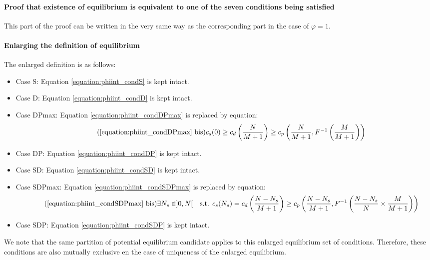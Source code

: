 \documentclass[english, a4paper]{article}
\theoremstyle{plain}
\theoremstyle{definition}
\theoremstyle{remark}
\begin{document}
\paragraph{Proof that existence of equilibrium is equivalent to one of the seven conditions being satisfied}

This part of the proof can be written in the very same way as the corresponding part in the case of $\varphi = 1$.

\paragraph{Enlarging the definition of equilibrium}

The enlarged definition is as follows:
\begin{itemize}
    \item Case S: Equation \ref{equation:phiint_condS} is kept intact.
    \item Case D: Equation \ref{equation:phiint_condD} is kept intact.
    \item Case DPmax: Equation \ref{equation:phiint_condDPmax} is replaced by equation:
    \begin{equation}
        \label{equation:phiint_condDPmaxbis}
        \tag{\ref{equation:phiint_condDPmax} bis}
        c_s(0) \geq c_d\left(\frac{N}{M + 1} \right) \geq c_p\left(\frac{N}{M + 1}, F^{-1}\left(\frac{M}{M + 1}\right) \right)
    \end{equation}
    \item Case DP: Equation \ref{equation:phiint_condDP} is kept intact.
    \item Case SD: Equation \ref{equation:phiint_condSD} is kept intact.
    \item Case SDPmax: Equation \ref{equation:phiint_condSDPmax} is replaced by equation:
    \begin{equation}
        \label{equation:phiint_condSDPmaxbis}
        \tag{\ref{equation:phiint_condSDPmax} bis}
        \exists N_s \in ]0, N[ \quad \text{s.t. } c_s(N_s) = c_d\left(\frac{N - N_s}{M + 1}\right) \geq c_p\left(\frac{N - N_s}{M + 1}, F^{-1} \left( \frac{N - N_s}{N}\times \frac{M}{M + 1} \right)\right)
    \end{equation}
    \item Case SDP: Equation \ref{equation:phiint_condSDP} is kept intact.
\end{itemize}

We note that the same partition of potential equilibrium candidate applies to this enlarged equilibrium set of conditions. Therefore, these conditions are also mutually exclusive en the case of uniqueness of the enlarged equilibrium.
\end{document}
